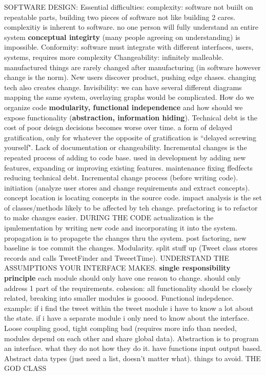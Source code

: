 \documentclass[10pt]{article}
\begin{document}
\begin{landscape}
\begin{multicols*}{6}
SOFTWARE DESIGN:
Essential difficulties: complexity: software not buiilt on repeatable parts, building two pieces of software not like building 2 cares. complexitiy is inherent to software. no one person will fully understand an entire system \textbf{conceptual integirty} (many people agreeing on understanding) is impossible.
Conformity: software must integrate with different interfaces, users, systems, requires more complexity
Changeability: infinitely malleable. manufactured things are rarely changed after manufacturing (in software however change is the norm). New users discover product, pushing edge chases. changing tech also creates change.
Invisibility: we can have several different diagrams mapping the same system, overlaying graphs would be complicated.
How do we organize code \textbf{modularity, functional independence} and how should we expose functionality (\textbf{abstraction, information hiding}).
Technical debt is the cost of poor deisgn decisions becomes worse over time. a form of delayed gratification, only for whatever the opposite of gratification is ``delayed screwing yourself". Lack of documentation or changeability.
Incremental changes is the repeated process of adding to code base. used in development by adding new features, expanding or improving existing features. maintenance fixing ffedfects reducing technical debt.
Incremental change process (before writing code). initiation (analyze user stores and change requirements and extract concepts). concept location is locating concepts in the source code. impact analysis is the set of classes/methods likely to be affected by teh change. prefactoring is to refactor to make changes easier. DURING THE CODE actualization is the ipmlementation by writing new code and incorporating it into the system. propagation is to propagete the changes thru the system. post factoring, new baseline is toe commit the changes.
Modularity. split stuff up (Tweet class stores records and calls TweetFinder and TweeetTime). UNDERSTAND THE ASSUMPTIONS YOUR INTERFACE MAKES. \textbf{single responsibility principle} each module should only have one reason to change. should only address 1 part of the requirements. cohesion: all functionality should be closely related, breaking into smaller modules is gooood.
Functional indepdence. example: if i find the tweet within the tweet module i have to know a lot about the state. if i have a separate module i only need to know about the interface. Loose coupling good, tight compling bad (requires more info than needed, modules depend on each other and share global data).
Abstraction is to program an interface. what they do not how they do it. have functions input output based. Abstract data types (just need a list, doesn't matter what). things to avoid. THE GOD CLASS

\end{multicols*}
\end{landscape}
\end{document}

